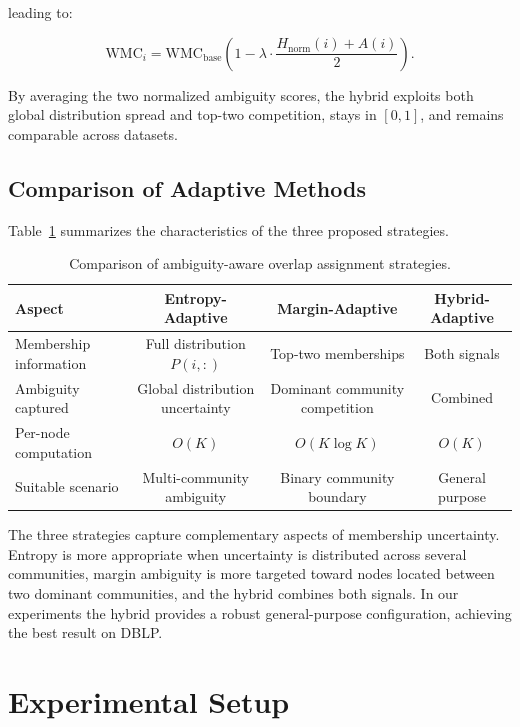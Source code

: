 \documentclass[a4paper,11pt,oneside,onecolumn,preprint]{elsarticle}
\numberwithin{equation}{section}
\begin{document}
leading to:

\begin{equation}
\mathrm{WMC}_i =
\mathrm{WMC}_{\mathrm{base}}
\left(1-\lambda \cdot \frac{H_{\mathrm{norm}}(i) + A(i)}{2}\right).
\label{eq:hybrid-adaptive}
\end{equation}

By averaging the two normalized ambiguity scores, the hybrid exploits both global distribution spread and top-two competition, stays in $[0,1]$, and remains comparable across datasets.

\subsection{Comparison of Adaptive Methods}
\label{subsec:comparison}

Table~\ref{tab:method-comparison} summarizes the characteristics of the three proposed strategies.

\begin{table}[ht]
\centering
\caption{Comparison of ambiguity-aware overlap assignment strategies.}
\label{tab:method-comparison}
\begin{tabular}{lccc}
\toprule
\textbf{Aspect} & \textbf{Entropy-Adaptive} & \textbf{Margin-Adaptive} & \textbf{Hybrid-Adaptive} \\
\midrule
Membership information & Full distribution $P(i,:)$ & Top-two memberships & Both signals \\
Ambiguity captured & Global distribution uncertainty & Dominant community competition & Combined \\
Per-node computation & $O(K)$ & $O(K \log K)$ & $O(K)$ \\
Suitable scenario & Multi-community ambiguity & Binary community boundary & General purpose \\
\bottomrule
\end{tabular}
\end{table}

The three strategies capture complementary aspects of membership uncertainty.
Entropy is more appropriate when uncertainty is distributed across several communities, margin ambiguity is more targeted toward nodes located between two dominant communities, and the hybrid combines both signals.
In our experiments the hybrid provides a robust general-purpose configuration, achieving the best result on DBLP.
\section{Experimental Setup}
\label{sec:setup}
\end{document}
